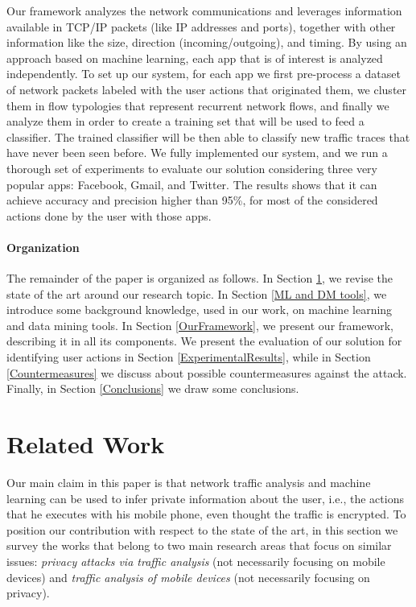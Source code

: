\documentclass{acm_proc_article-sp}
\begin{document}
Our framework analyzes the network communications and leverages information available 
in TCP/IP packets (like IP addresses and ports), together with other 
information like the size, direction (incoming/outgoing), and timing. By 
using an approach based on machine learning, each app that is of interest is analyzed independently. 
To set up our system, for each app we first pre-process a dataset of network packets labeled with 
the user actions that originated them, we cluster them in flow typologies that represent recurrent network flows, and 
finally  we analyze them in order to create a training set that will be used to feed a 
classifier. The trained classifier will be then able to classify new traffic 
traces that have never been seen before.
We fully implemented our system, and we run a thorough set of experiments to evaluate our solution considering three very popular apps: Facebook, Gmail, and Twitter.
The results shows that it can achieve accuracy and precision higher than 95\%, for most of the considered actions done by the user with those apps.


 \paragraph{Organization}
The remainder of the paper is organized as follows. 
In Section \ref{Related Work}, we revise the state of the art around our research topic. 
In Section \ref{ML and DM tools}, we introduce some background knowledge, used in our work, on machine learning and data mining tools.
In Section \ref{OurFramework}, we present our framework, describing it in all its components.
We present the evaluation of our solution for identifying user actions in Section \ref{ExperimentalResults}, 
while in Section \ref{Countermeasures} we discuss about possible countermeasures against the attack.
Finally, in Section \ref{Conclusions} we draw some conclusions.



\section{Related Work}
\label{Related Work}

Our main claim in this paper is that network traffic analysis and machine learning can be used to infer
private information about the user, i.e., the actions that he executes with his mobile phone,
even thought the traffic is encrypted.
To position our contribution with respect to the state of the art, in this section we survey the works that belong to two main research areas that focus on  
similar issues: \textit{privacy attacks via traffic analysis} (not necessarily focusing on mobile devices) and \textit{traffic analysis of mobile devices} (not necessarily focusing on privacy). 
\end{document}
